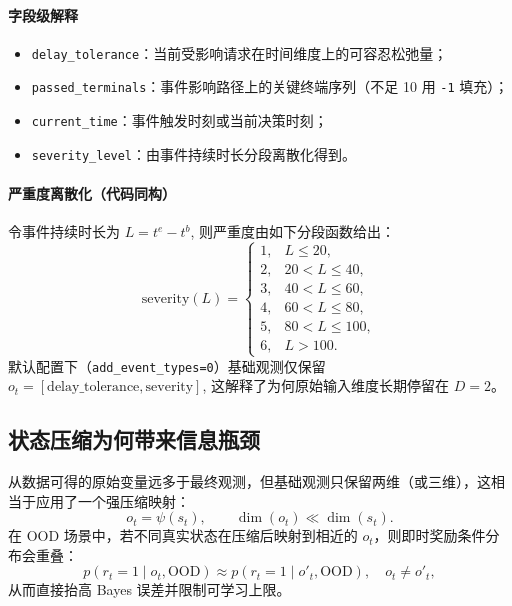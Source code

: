 ﻿\documentclass[11pt,a4paper]{ctexart}
\begin{document}
\paragraph{字段级解释}
\begin{itemize}
  \item \texttt{delay\_tolerance}：当前受影响请求在时间维度上的可容忍松弛量；
  \item \texttt{passed\_terminals}：事件影响路径上的关键终端序列（不足 10 用 \texttt{-1} 填充）；
  \item \texttt{current\_time}：事件触发时刻或当前决策时刻；
  \item \texttt{severity\_level}：由事件持续时长分段离散化得到。
\end{itemize}

\paragraph{严重度离散化（代码同构）}
令事件持续时长为
\(
L=t^{e}-t^{b}
\),
则严重度由如下分段函数给出：
\begin{equation}
\text{severity}(L)=
\begin{cases}
1,&L\le 20,\\
2,&20<L\le 40,\\
3,&40<L\le 60,\\
4,&60<L\le 80,\\
5,&80<L\le 100,\\
6,&L>100.
\end{cases}
\end{equation}
默认配置下（\texttt{add\_event\_types=0}）基础观测仅保留
\(
o_t=[\text{delay\_tolerance},\text{severity}]
\),
这解释了为何原始输入维度长期停留在 $D=2$。

\subsection{状态压缩为何带来信息瓶颈}
从数据可得的原始变量远多于最终观测，但基础观测只保留两维（或三维），这相当于应用了一个强压缩映射：
\begin{equation}
o_t=\psi(s_t),\qquad \dim(o_t)\ll \dim(s_t).
\end{equation}
在 OOD 场景中，若不同真实状态在压缩后映射到相近的 $o_t$，则即时奖励条件分布会重叠：
\begin{equation}
p(r_t=1\mid o_t,\text{OOD}) \approx p(r_t=1\mid o'_t,\text{OOD}),\quad o_t\neq o'_t,
\end{equation}
从而直接抬高 Bayes 误差并限制可学习上限。
\end{document}
